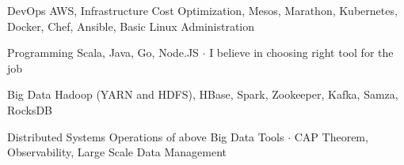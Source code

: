 

\begin{cvskills}

  \cvskill
    {DevOps} %
    {AWS, Infrastructure Cost Optimization, Mesos, Marathon, Kubernetes, Docker, Chef, Ansible, Basic Linux Administration} %

  \cvskill
    {Programming} %
    {Scala, Java, Go, Node.JS ${\cdotp}$ I believe in choosing right tool for the job} %

  \cvskill
    {Big Data} %
    {Hadoop (YARN and HDFS), HBase, Spark, Zookeeper, Kafka, Samza, RocksDB} %

  \cvskill
    {Distributed Systems} %
    {Operations of above Big Data Tools ${\cdotp}$ CAP Theorem, Observability, Large Scale Data Management} %

\end{cvskills}
